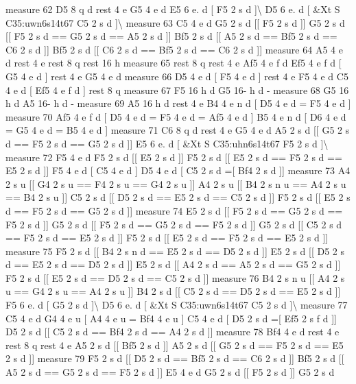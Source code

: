 measure 62 D5 8 q d rest 4 e G5 4 e d E5 6 e. d \mbox{[} F5 2 s d \mbox{]}\textbackslash{} D5 6 e. d \mbox{[} \&Xt S C35\+:uwn6s14t67 C5 2 s d \mbox{]}\textbackslash{} measure 63 C5 4 e d G5 2 s d \mbox{[}\mbox{[} F5 2 s d \mbox{]}\mbox{]} G5 2 s d \mbox{[}\mbox{[} F5 2 s d == G5 2 s d == A5 2 s d \mbox{]}\mbox{]} Bf5 2 s d \mbox{[}\mbox{[} A5 2 s d == Bf5 2 s d == C6 2 s d \mbox{]}\mbox{]} Bf5 2 s d \mbox{[}\mbox{[} C6 2 s d == Bf5 2 s d == C6 2 s d \mbox{]}\mbox{]} measure 64 A5 4 e d rest 4 e rest 8 q rest 16 h measure 65 rest 8 q rest 4 e Af5 4 e f d Ef5 4 e f d \mbox{[} G5 4 e d \mbox{]} rest 4 e G5 4 e d measure 66 D5 4 e d \mbox{[} F5 4 e d \mbox{]} rest 4 e F5 4 e d C5 4 e d \mbox{[} Ef5 4 e f d \mbox{]} rest 8 q measure 67 F5 16 h d G5 16-\/ h d -\/ measure 68 G5 16 h d A5 16-\/ h d -\/ measure 69 A5 16 h d rest 4 e B4 4 e n d \mbox{[} D5 4 e d = F5 4 e d \mbox{]} measure 70 Af5 4 e f d \mbox{[} D5 4 e d = F5 4 e d = Af5 4 e d \mbox{]} B5 4 e n d \mbox{[} D6 4 e d = G5 4 e d = B5 4 e d \mbox{]} measure 71 C6 8 q d rest 4 e G5 4 e d A5 2 s d \mbox{[}\mbox{[} G5 2 s d == F5 2 s d == G5 2 s d \mbox{]}\mbox{]} E5 6 e. d \mbox{[} \&Xt S C35\+:uhn6s14t67 F5 2 s d \mbox{]}\textbackslash{} measure 72 F5 4 e d F5 2 s d \mbox{[}\mbox{[} E5 2 s d \mbox{]}\mbox{]} F5 2 s d \mbox{[}\mbox{[} E5 2 s d == F5 2 s d == E5 2 s d \mbox{]}\mbox{]} F5 4 e d \mbox{[} C5 4 e d \mbox{]} D5 4 e d \mbox{[} C5 2 s d =\mbox{[} Bf4 2 s d \mbox{]}\mbox{]} measure 73 A4 2 s u \mbox{[}\mbox{[} G4 2 s u == F4 2 s u == G4 2 s u \mbox{]}\mbox{]} A4 2 s u \mbox{[}\mbox{[} B4 2 s n u == A4 2 s u == B4 2 s u \mbox{]}\mbox{]} C5 2 s d \mbox{[}\mbox{[} D5 2 s d == E5 2 s d == C5 2 s d \mbox{]}\mbox{]} F5 2 s d \mbox{[}\mbox{[} E5 2 s d == F5 2 s d == G5 2 s d \mbox{]}\mbox{]} measure 74 E5 2 s d \mbox{[}\mbox{[} F5 2 s d == G5 2 s d == F5 2 s d \mbox{]}\mbox{]} G5 2 s d \mbox{[}\mbox{[} F5 2 s d == G5 2 s d == F5 2 s d \mbox{]}\mbox{]} G5 2 s d \mbox{[}\mbox{[} C5 2 s d == F5 2 s d == E5 2 s d \mbox{]}\mbox{]} F5 2 s d \mbox{[}\mbox{[} E5 2 s d == F5 2 s d == E5 2 s d \mbox{]}\mbox{]} measure 75 F5 2 s d \mbox{[}\mbox{[} B4 2 s n d == E5 2 s d == D5 2 s d \mbox{]}\mbox{]} E5 2 s d \mbox{[}\mbox{[} D5 2 s d == E5 2 s d == D5 2 s d \mbox{]}\mbox{]} E5 2 s d \mbox{[}\mbox{[} A4 2 s d == A5 2 s d == G5 2 s d \mbox{]}\mbox{]} F5 2 s d \mbox{[}\mbox{[} E5 2 s d == D5 2 s d == C5 2 s d \mbox{]}\mbox{]} measure 76 B4 2 s n u \mbox{[}\mbox{[} A4 2 s u == G4 2 s u == A4 2 s u \mbox{]}\mbox{]} B4 2 s d \mbox{[}\mbox{[} C5 2 s d == D5 2 s d == E5 2 s d \mbox{]}\mbox{]} F5 6 e. d \mbox{[} G5 2 s d \mbox{]}\textbackslash{} D5 6 e. d \mbox{[} \&Xt S C35\+:uwn6s14t67 C5 2 s d \mbox{]}\textbackslash{} measure 77 C5 4 e d G4 4 e u \mbox{[} A4 4 e u = Bf4 4 e u \mbox{]} C5 4 e d \mbox{[} D5 2 s d =\mbox{[} Ef5 2 s f d \mbox{]}\mbox{]} D5 2 s d \mbox{[}\mbox{[} C5 2 s d == Bf4 2 s d == A4 2 s d \mbox{]}\mbox{]} measure 78 Bf4 4 e d rest 4 e rest 8 q rest 4 e A5 2 s d \mbox{[}\mbox{[} Bf5 2 s d \mbox{]}\mbox{]} A5 2 s d \mbox{[}\mbox{[} G5 2 s d == F5 2 s d == E5 2 s d \mbox{]}\mbox{]} measure 79 F5 2 s d \mbox{[}\mbox{[} D5 2 s d == Bf5 2 s d == C6 2 s d \mbox{]}\mbox{]} Bf5 2 s d \mbox{[}\mbox{[} A5 2 s d == G5 2 s d == F5 2 s d \mbox{]}\mbox{]} E5 4 e d G5 2 s d \mbox{[}\mbox{[} F5 2 s d \mbox{]}\mbox{]} G5 2 s d 